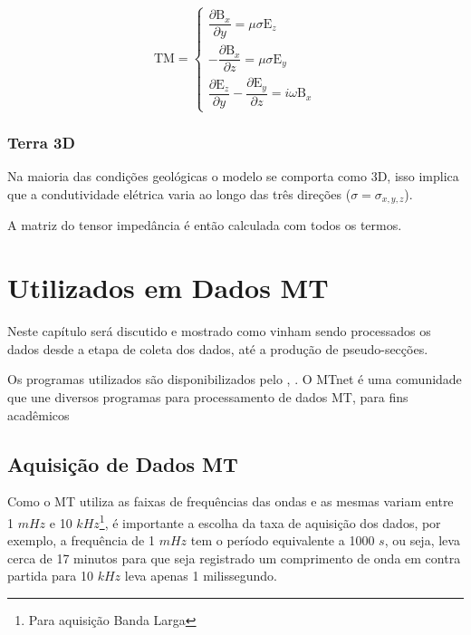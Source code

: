 	    \begin{equation}
	     \textrm{TM} = \left \{ \begin{array}{l}
	            \dfrac{\partial \textrm{B}_x}{\partial y} = \mu \sigma \textrm{E}_z \\[10pt]
	           -\dfrac{\partial \textrm{B}_x}{\partial z} = \mu \sigma \textrm{E}_y \\[10pt]
	           \dfrac{\partial \textrm{E}_z}{\partial y} - \dfrac{\partial \textrm{E}_y}{\partial z} = i \omega \textrm{B}_x 
	           \end{array} \right.
	    \end{equation}
        
        
        \subsection{Terra 3D}
        Na maioria das condições geológicas o modelo se comporta como 3D, isso implica que a 
	    condutividade elétrica varia ao longo das três direções ($\sigma = \sigma_{x,y,z}$).
	    
	    A matriz do tensor impedância é então calculada com todos os termos.    

    \chapter{ Utilizados em Dados MT}
        \label{cap-proc_mt}
            
        Neste capítulo será discutido e mostrado como vinham sendo processados os dados \MT desde a etapa de coleta dos dados, até a produção de pseudo-secções. 
        
        Os programas utilizados são disponibilizados pelo  \citeauthor{mtnet}, \citeyearpar{mtnet}. O  MTnet é uma comunidade que une diversos programas para processamento de dados MT, para fins acadêmicos  
        
    \section{Aquisição de Dados MT}
        \label{sec_aquisicao_dados}
        Como o MT utiliza as faixas de frequências das ondas e as mesmas variam entre 1 $mHz$ e 10 $kHz$\footnote{Para aquisição Banda Larga}, é importante a escolha da taxa de aquisição dos dados, por exemplo, a frequência de 1 $mHz$ tem o período equivalente a 1000 $s$, ou seja, leva cerca de 17 minutos para que seja registrado um comprimento de onda em contra partida para 10 $kHz$ leva apenas 1 milissegundo.
        
